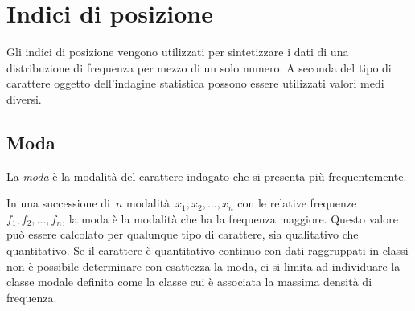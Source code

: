 
\section{Indici di posizione}
\label{sec:c_stat_posizione}

Gli indici di posizione vengono utilizzati per sintetizzare i dati di una 
distribuzione di frequenza per mezzo di un solo numero.
A seconda del tipo di carattere oggetto dell'indagine statistica possono 
essere utilizzati valori medi diversi.

\subsection{Moda}

\begin{definizione}
La \emph{moda} è la modalità del carattere indagato che si presenta più 
frequentemente.
\end{definizione}

In una successione di~$n$ modalità~$x_1, x_2, \ldots, x_n$
con le relative frequenze~$f_1, f_2, \ldots, f_n$, la moda è la modalità 
che ha la frequenza maggiore.
Questo valore può essere calcolato per qualunque tipo di carattere, sia 
qualitativo che quantitativo.
Se il carattere è quantitativo continuo con dati raggruppati in classi non 
è possibile determinare con esattezza la moda, ci si limita
ad individuare la classe modale definita come la classe cui è associata la 
massima densità di frequenza.

